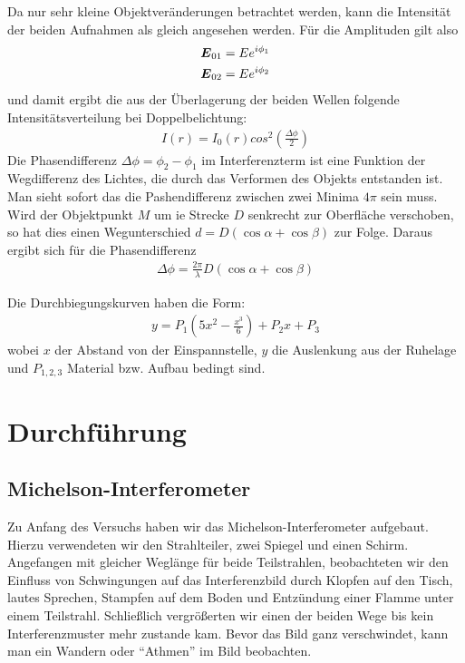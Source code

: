 \documentclass[12pt]{article}
\renewcommand*\vec[1]{{\mbox{\boldmath\ensuremath{#1}}}}
\begin{document}
Da nur sehr kleine Objektveränderungen betrachtet werden, kann die Intensität der beiden
Aufnahmen als gleich angesehen werden. Für die Amplituden gilt also
\begin{align*}
 \vec E_{01} &= E e^{i\phi_1} \\
 \vec E_{02} &= E e^{i\phi_2}
\end{align*}
und damit ergibt die aus der Überlagerung der beiden Wellen folgende Intensitätsverteilung bei Doppelbelichtung:
\begin{align}
 I(r) = I_0(r) cos^2\left( \frac{\Delta\phi}{2} \right)
\end{align}
Die Phasendifferenz $\Delta\phi = \phi_2 - \phi_1$ im Interferenzterm ist eine Funktion der Wegdifferenz des
Lichtes, die durch das Verformen des Objekts entstanden ist. Man sieht sofort das die Pashendifferenz zwischen zwei Minima $4\pi$ sein muss.
 Wird der Objektpunkt $M$ um ie Strecke $D$ senkrecht zur Oberfläche verschoben, so hat dies einen Wegunterschied $d = D(\cos{\alpha} + \cos{\beta})$ zur Folge.
Daraus ergibt sich für die Phasendifferenz
\begin{align}
 \Delta\phi = \frac{2\pi}{\lambda} D(\cos{\alpha} + \cos{\beta})
\end{align}

Die Durchbiegungskurven haben die Form:
\begin{align}
 y = P_1 \left(5 x^2 - \frac{x^3}{6}\right) + P_2 x + P_3
\end{align}
wobei $x$ der Abstand von der Einspannstelle, $y$ die Auslenkung aus der Ruhelage und $P_{1,2,3}$ Material bzw. Aufbau bedingt sind.

\section{Durchführung}
\subsection{Michelson-Interferometer}
Zu Anfang des Versuchs haben wir das Michelson-Interferometer aufgebaut. Hierzu verwendeten wir den Strahlteiler, zwei Spiegel und einen Schirm.
Angefangen mit gleicher Weglänge für beide Teilstrahlen, beobachteten wir den Einfluss von Schwingungen auf das Interferenzbild durch Klopfen auf den Tisch,
lautes Sprechen, Stampfen auf dem Boden und Entzündung einer Flamme unter einem Teilstrahl. Schließlich vergrößerten wir einen der beiden Wege bis kein 
Interferenzmuster mehr zustande kam. Bevor das Bild ganz verschwindet, kann man ein Wandern oder ``Athmen'' im Bild beobachten.
\end{document}
